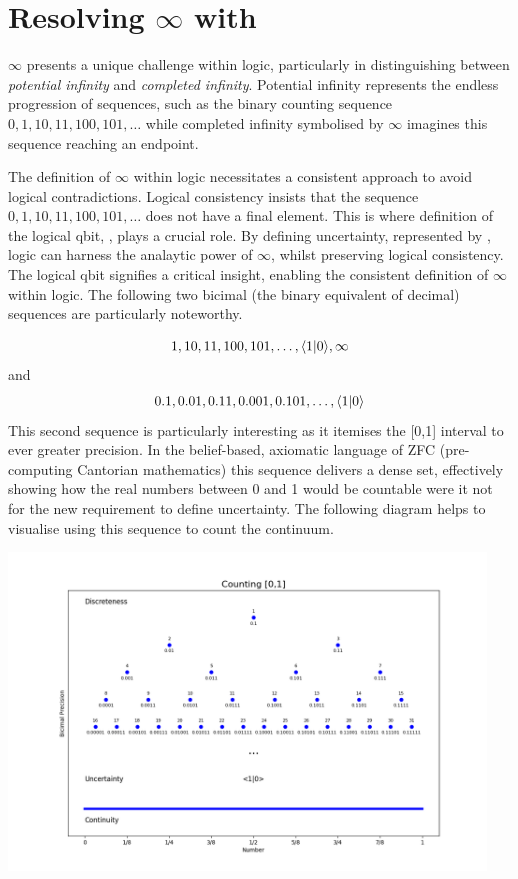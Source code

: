 \documentclass[12pt]{article}
\begin{document}
\section*{Resolving $\infty$ with \qbit{}}

$\infty$ presents a unique challenge within logic, particularly in distinguishing between \textit{potential infinity} and \textit{completed infinity}. Potential infinity represents the endless progression of sequences, such as the binary counting sequence $0, 1, 10, 11, 100, 101, \ldots$ while completed infinity symbolised by $\infty$ imagines this sequence reaching an endpoint.

The definition of $\infty$ within logic necessitates a consistent approach to avoid logical contradictions. Logical consistency insists that the sequence $0, 1, 10, 11, 100, 101, \ldots$ does not have a final element. This is where definition of the logical qbit, \qbit{}, plays a crucial role. By defining uncertainty, represented by \qbit{}, logic can harness the analaytic power of $\infty$, whilst preserving logical consistency. The logical qbit signifies a critical insight, enabling the consistent definition of $\infty$ within logic. The following two bicimal (the binary equivalent of decimal) sequences are particularly noteworthy.

\begin{equation}
    1, 10, 11, 100, 101, \ldots, \langle 1 | 0 \rangle{}, \infty
\end{equation}
and
\begin{equation}
    0.1, 0.01, 0.11, 0.001, 0.101, \ldots, \langle 1 | 0 \rangle{}
\end{equation}
This second sequence is particularly interesting as it itemises the [0,1] interval to ever greater precision. In the belief-based, axiomatic language of ZFC (pre-computing Cantorian mathematics) this sequence delivers a dense set, effectively showing how the real numbers between 0 and 1 would be countable were it not for the new requirement to define \qbit{} uncertainty. The following diagram helps to visualise using this sequence to count the continuum.

\includegraphics[width=0.95\textwidth]{continuity.png}
\end{document}
